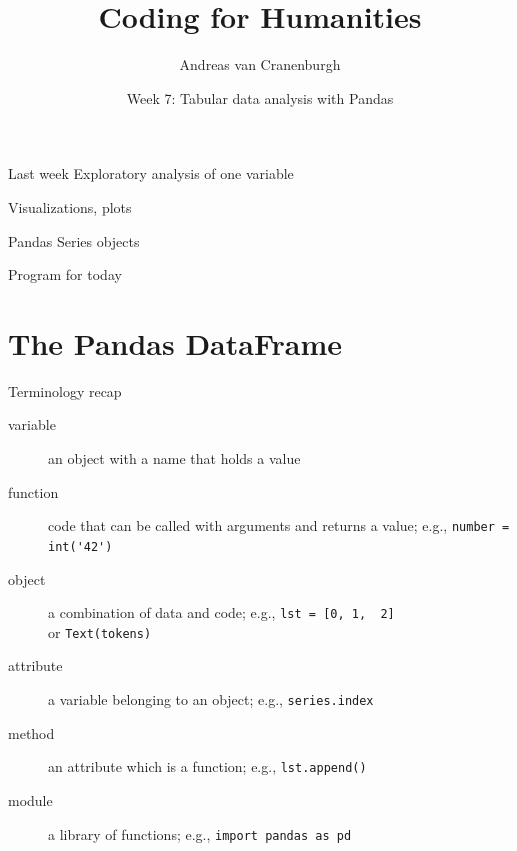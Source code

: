 \documentclass[aspectratio=169,usenames,dvipsnames]{beamer}
\title{Coding for Humanities}
\author{Andreas van Cranenburgh}
\date{Week 7: Tabular data analysis with Pandas}
\begin{document}
\maketitle


\begin{frame}{Last week}
    Exploratory analysis of one variable

    \vspace{1em}
    Visualizations, plots

    \vspace{1em}
    Pandas Series objects
\end{frame}

\begin{frame}{Program for today}
\tableofcontents
\end{frame}



\section{The Pandas DataFrame}
\frame{\tableofcontents[currentsection]}

\begin{frame}[fragile]{Terminology recap}
    \begin{description}
        \item[variable] an object with a name that holds a value
        \item[function] code that can be called with arguments and returns a value;
                e.g., \lstinline|number = int('42')|
        \item[object] a combination of data and code; e.g., \lstinline|lst = [0, 1,  2]| \\
            or \lstinline|Text(tokens)|
        \item[attribute] a variable belonging to an object; e.g., \lstinline|series.index|
        \item[method] an attribute which is a function; e.g., \lstinline|lst.append()|
        \item[module] a library of functions; e.g., \lstinline|import pandas as pd|
    \end{description}
\end{frame}
\end{document}
